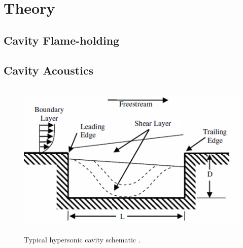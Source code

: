 
\chapter{Theory} %

\label{Chapter2} %



\section{Cavity Flame-holding}





\section{Cavity Acoustics}





\newpage

\begin{figure}
\centering
\includegraphics[height=3in]{Figures/CavityDiagram.png}
\caption[Diagram of typical cavity]{Typical hypersonic cavity schematic \cite{lazar2008control}.}
\end{figure}